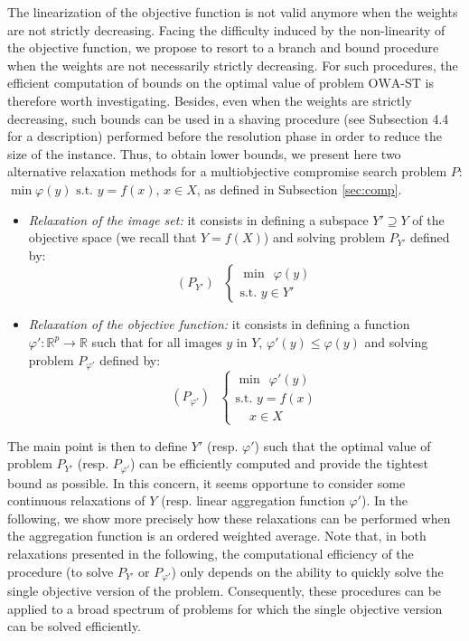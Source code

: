 \documentclass[final,3p,times]{elsarticle}
\newcommand{\owa}{\mbox{OWA}}
\newcommand{\RP}{\mathbb{R}^p}
\newcommand{\R}{\mathbb{R}}
\begin{document}
The linearization of the objective function is not valid anymore when
the weights are not strictly decreasing. Facing the difficulty induced
by the non-linearity of the objective function, we propose to resort
to a branch and bound procedure when the weights are not necessarily
strictly decreasing. For such procedures, the efficient computation of
bounds on the optimal value of problem $\owa$-ST is therefore worth
investigating. Besides, even when the weights are strictly decreasing, such bounds can be used in a shaving procedure (see Subsection 4.4 for a description) performed before the resolution phase in order to reduce the size of the instance. Thus, to obtain lower bounds, we present here two alternative relaxation methods for a multiobjective compromise search problem $P$: $\min
\varphi(y) \mbox{ s.t. } y=f(x),\, x \in X$, as defined in Subsection
\ref{sec:comp}.
\begin{itemize}
\item \emph{Relaxation of the image set:} it
  consists in defining a subspace $Y' \supseteq Y$ of the objective
  space (we recall that $Y = f(X)$) and solving problem $P_{Y'}$ defined by:      
  $$(P_{Y'}) ~~~\left\{
    \begin{array}{ll}
      \min ~~ \varphi(y)\\\mbox{s.t. } y  \in Y'
    \end{array}\right. $$    
\item \emph{Relaxation of the objective function:} it consists in
  defining a function $\varphi': \RP \rightarrow \R$ such that for all
  images $y$ in $Y$, $\varphi'(y) \leq \varphi(y)$ and solving problem $P_{\varphi'}$ defined by:
  $$(P_{\varphi'})~~~ \left\{
    \begin{array}{ll}
      \min ~~ \varphi'(y)\\\mbox{s.t. } y  =  f(x)\\
      ~~~~~x  \in  X
    \end{array}\right. $$ 
\end{itemize}     

  The main point is then to define $Y'$ (resp. $\varphi'$) such that
  the optimal value of problem $P_{Y'}$ (resp. $P_{\varphi'}$) can be
  efficiently computed and provide the tightest bound as possible. In
  this concern, it seems opportune to consider some continuous
  relaxations of $Y$ (resp. linear aggregation function
  $\varphi'$). In the following, we show more precisely how these relaxations can
  be performed when the aggregation function is an ordered weighted
  average. Note that, in both relaxations presented in the following,
  the computational efficiency of the procedure (to solve $P_{Y'}$ or $P_{\varphi'}$) only depends on the ability to quickly solve the single objective version of the
  problem. Consequently, these procedures can be applied to a broad
  spectrum of problems for which the single objective version can be
  solved efficiently. 
\end{document}
